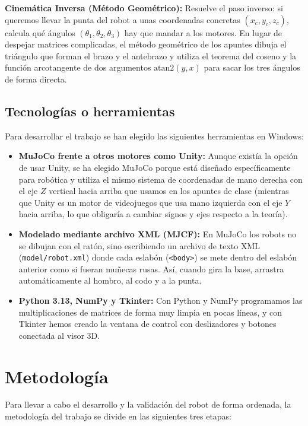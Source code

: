 \documentclass[11pt,a4paper]{article}
\begin{document}
\textbf{Cinemática Inversa (Método Geométrico):}
Resuelve el paso inverso: si queremos llevar la punta del robot a unas coordenadas concretas $(x_c, y_c, z_c)$, calcula qué ángulos $(\theta_1, \theta_2, \theta_3)$ hay que mandar a los motores. En lugar de despejar matrices complicadas, el método geométrico de los apuntes dibuja el triángulo que forman el brazo y el antebrazo y utiliza el teorema del coseno y la función arcotangente de dos argumentos $\text{atan2}(y, x)$ para sacar los tres ángulos de forma directa.

\subsection{Tecnologías o herramientas}
Para desarrollar el trabajo se han elegido las siguientes herramientas en Windows:
\begin{itemize}
    \item \textbf{MuJoCo frente a otros motores como Unity:} Aunque existía la opción de usar Unity, se ha elegido MuJoCo porque está diseñado específicamente para robótica y utiliza el mismo sistema de coordenadas de mano derecha con el eje $Z$ vertical hacia arriba que usamos en los apuntes de clase (mientras que Unity es un motor de videojuegos que usa mano izquierda con el eje $Y$ hacia arriba, lo que obligaría a cambiar signos y ejes respecto a la teoría).
    \item \textbf{Modelado mediante archivo XML (MJCF):} En MuJoCo los robots no se dibujan con el ratón, sino escribiendo un archivo de texto XML (\texttt{model/robot.xml}) donde cada eslabón (\texttt{<body>}) se mete dentro del eslabón anterior como si fueran muñecas rusas. Así, cuando gira la base, arrastra automáticamente al hombro, al codo y a la punta.
    \item \textbf{Python 3.13, NumPy y Tkinter:} Con Python y NumPy programamos las multiplicaciones de matrices de forma muy limpia en pocas líneas, y con Tkinter hemos creado la ventana de control con deslizadores y botones conectada al visor 3D.
\end{itemize}

\section{Metodología}

Para llevar a cabo el desarrollo y la validación del robot de forma ordenada, la metodología del trabajo se divide en las siguientes tres etapas:
\end{document}
